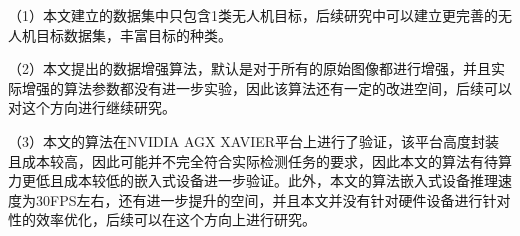\begin{conclusions}
（1）本文建立的数据集中只包含1类无人机目标，后续研究中可以建立更完善的无人机目标数据集，丰富目标的种类。

（2）本文提出的数据增强算法，默认是对于所有的原始图像都进行增强，并且实际增强的算法参数都没有进一步实验，因此该算法还有一定的改进空间，后续可以对这个方向进行继续研究。

（3）本文的算法在NVIDIA AGX XAVIER平台上进行了验证，该平台高度封装且成本较高，因此可能并不完全符合实际检测任务的要求，因此本文的算法有待算力更低且成本较低的嵌入式设备进一步验证。此外，本文的算法嵌入式设备推理速度为30FPS左右，还有进一步提升的空间，并且本文并没有针对硬件设备进行针对性的效率优化，后续可以在这个方向上进行研究。



\end{conclusions}
